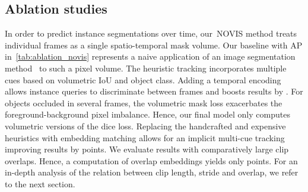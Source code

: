 \documentclass{article}
\newcommand{\method}{\mbox{NOVIS}}
\theoremstyle{plain}
\theoremstyle{definition}
\theoremstyle{remark}
\begin{document}
\subsection{Ablation studies}


In order to predict instance segmentations over time, our~\method{} method treats individual frames as a single spatio-temporal mask volume.
Our baseline with  AP in~\cref{tab:ablation_novis} represents a naive application of an image segmentation method~\cite{cheng2021mask2former} to such a pixel volume.
The heuristic tracking incorporates multiple cues based on volumetric IoU and object class.
Adding a temporal encoding allows instance queries to discriminate between frames and boosts results by .
For objects occluded in several frames, the volumetric mask loss exacerbates the foreground-background pixel imbalance.
Hence, our final model only computes volumetric versions of the dice loss.
Replacing the handcrafted and expensive heuristics with embedding matching allows for an implicit multi-cue tracking improving results by  points.
We evaluate results with comparatively large clip overlaps.
Hence, a computation of overlap embeddings yields only  points.
For an in-depth analysis of the relation between clip length, stride and overlap, we refer to the next section. 
\end{document}
